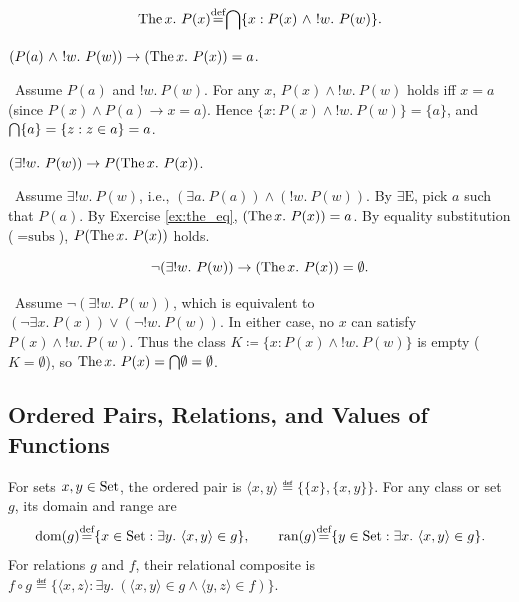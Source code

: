 \documentclass[10pt,a4paper]{article}
\begin{document}
\begin{definition}
$$\The x.\ P(x) \eqdef \inter \{x : P(x)\ \land\ !w.\ P(w)\}.$$
\end{definition}

\begin{exercise}\label{ex:the_eq}
$(P(a)\ \land\ !w.\ P(w)) \to (\The x.\ P(x))=a$.
\end{exercise}
\myprf\ Assume $P(a)$ and $!w.\ P(w)$. For any $x$, $P(x) \land !w.\ P(w)$ holds iff $x = a$ (since $P(x) \land P(a) \to x=a$). Hence $\{x : P(x) \land !w.\ P(w)\} = \{a\}$, and ${\bigcap} \{a\} = \{z : z \in a\} = a$. \myqed

\begin{exercise}\label{ex:the_prop}
$(\exists !w.\ P(w)) \to P(\The x.\ P(x))$.
\end{exercise}
\myprf\ Assume $\exists !w.\ P(w)$, i.e., $(\exists a.\ P(a)) \land (!w.\ P(w))$. By $\exists\textrm{E}$, pick $a$ such that $P(a)$. By Exercise \ref{ex:the_eq}, $({\textrm{The\,}} x.\ P(x)) = a$. By equality substitution ($=\textrm{subs}$), $P({\textrm{The\,}} x.\ P(x))$ holds. \myqed

\begin{lemma}\label{lem:the_default}
$$\neg (\exists !w.\ P(w)) \to ({\textrm{The\,}} x.\ P(x)) = \emptyset.$$
\end{lemma}
\myprf\ Assume $\neg (\exists !w.\ P(w))$, which is equivalent to $(\neg \exists x.\ P(x)) \lor (\neg !w.\ P(w))$. In either case, no $x$ can satisfy $P(x) \land !w.\ P(w)$. Thus the class $K \coloneqq \{x : P(x) \land !w.\ P(w)\}$ is empty ($K = \emptyset$), so ${\textrm{The\,}} x.\ P(x) = {\bigcap} \emptyset = \emptyset$. \myqed

\subsection{Ordered Pairs, Relations, and Values of Functions}
\begin{definition}\label{def:pair_rel}
For sets $x, y \in {\textrm{Set}}$, the ordered pair is $\langle x, y \rangle \eqdef \{\{x\}, \{x, y\}\}$. For any class or set $g$, its domain and range are
$${\textrm{dom}}(g) {\stackrel{{\textrm{def}}}{=}} \{x \in {\textrm{Set}} : \exists y.\ \langle x, y \rangle \in g\}, \qquad \textrm{ran}(g) {\stackrel{{\textrm{def}}}{=}} \{y \in {\textrm{Set}} : \exists x.\ \langle x, y \rangle \in g\}.$$
For relations $g$ and $f$, their relational composite is $f \circ g \eqdef \{\langle x, z \rangle : \exists y.\ (\langle x, y \rangle \in g \land \langle y, z \rangle \in f)\}$.
\end{definition}
\end{document}
